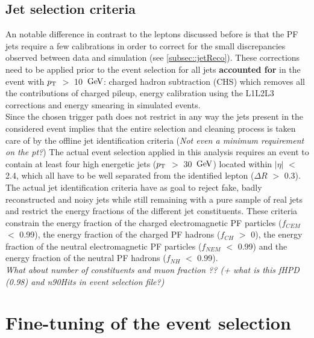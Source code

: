 \subsection{Jet selection criteria}
An notable difference in contrast to the leptons discussed before is that the PF jets require a few calibrations in order to correct for the small discrepancies observed between data and simulation (see \ref{subsec::jetReco}). These corrections need to be applied prior to the event selection for all jets \textbf{accounted for} in the event with $p_{\rm T}$ $>$ 10 $\, \mathrm{GeV}$: charged hadron subtraction (CHS) which removes all the contributions of charged pileup, energy calibration using the L1L2L3 corrections and energy smearing in simulated events.
\\

Since the chosen trigger path does not restrict in any way the jets present in the considered event implies that the entire selection and cleaning process is taken care of by the offline jet identification criteria (\textit{Not even a minimum requirement on the pt?})
The actual event selection applied in this analysis requires an event to contain at least four high energetic jets ($p_{\rm T}$ $>$ 30 $\, \mathrm{GeV}$) located within $\vert \eta \vert$ $<$ 2.4, which all have to be well separated from the identified lepton ($\Delta R$ $>$ 0.3).
The actual jet identification criteria have as goal to reject fake, badly reconstructed and noisy jets while still remaining with a pure sample of real jets and restrict the energy fractions of the different jet constituents. These criteria constrain the energy fraction of the charged electromagnetic PF particles ($f_{CEM}$ $<$ 0.99), the energy fraction of the charged PF hadrons ($f_{CH}$ $>$ 0), the energy fraction of the neutral electromagnetic PF particles ($f_{NEM}$ $<$ 0.99) and the energy fraction of the neutral PF hadrons ($f_{NH}$ $<$ 0.99).
\\

\textit{What about number of constituents and muon fraction ?? (+ what is this fHPD (0.98) and n90Hits in event selection file?)}


\section{Fine-tuning of the event selection}\label{sec::SpecificSelec}

